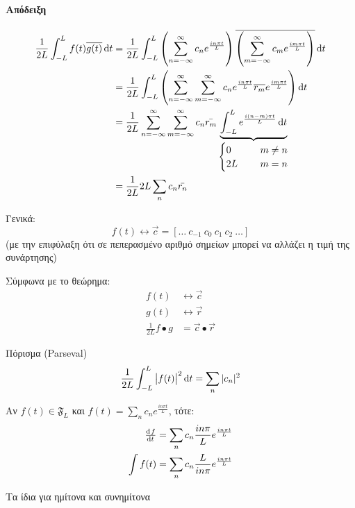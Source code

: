 \documentclass[11pt,a4paper,titlepage,final]{article}
\begin{document}
\paragraph{Απόδειξη}
\begin{align*}
\frac{1}{2L} \int_{-L}^L f(t) \overline{g(t)} \dif t &=
\frac{1}{2L} \int_{-L}^L 
	\left( \sum_{n=-\infty}^\infty c_n e^\frac{in\pi t}{L}
	\right)
	\overline{\left(
	\sum_{m=-\infty}^\infty c_m e^\frac{im\pi t}{L}
	\right)}
	\dif t
\\ &=
\frac{1}{2L} \int_{-L}^L \left(
\sum_{n=-\infty}^\infty \sum_{m=-\infty}^\infty
c_n e^\frac{in\pi t}{L}
\overline{r_m} e^\frac{im\pi t}{L} \right) \dif t
\\ &=
\frac{1}{2L}
\sum_{n=-\infty}^\infty
\sum_{m=-\infty}^\infty
c_n \bar{r_m}
\underbrace{\int_{-L}^L
e^\frac{i(n-m)\pi t}{L} \dif t}_{
\begin{cases}
0 \qquad & m \neq n\\
2L & m = n
\end{cases}
}
\\ &= \frac{1}{2L} 2L \sum_n c_n\bar{r_n}
\end{align*}

Γενικά:
\[
f(t) \leftrightarrow \vec{c} = [ \dots \ c_{-1}\  c_0\  c_1\ c_2\ \dots ]
\]
(με την επιφύλαξη ότι σε πεπερασμένο αριθμό σημείων μπορεί να αλλάζει η τιμή της συνάρτησης)

Σύμφωνα με το θεώρημα:
\begin{align*}
f(t) &\leftrightarrow \vec{c} \\
g(t) &\leftrightarrow \vec{r} \\
 \frac{1}{2L} f\bullet g &= \vec{c} \bullet \vec{r}
\end{align*}

\begin{theorem}{Πόρισμα (\textlatin{Parseval})}{}
\[
\frac{1}{2L} \int_{-L}^L
\left|
f(t)
\right|^2 \dif t
= \sum_n
|c_n|^2
\]
\end{theorem}

\begin{theorem}{}{}
Αν \(f(t) \in \mathfrak F_L\) και \(f(t) = \sum_n c_n e^\frac{in\pi t}{L}\), τότε:
\begin{align*}
\od{f}{t}&=\sum_n c_n \frac{in\pi}{L} e^\frac{in\pi t}{L} \\
\int f(t)&=\sum_n c_n \frac{L}{in\pi} e^\frac{in\pi t}{L}
\end{align*}

Τα ίδια για ημίτονα και συνημίτονα
\end{theorem}
\end{document}
